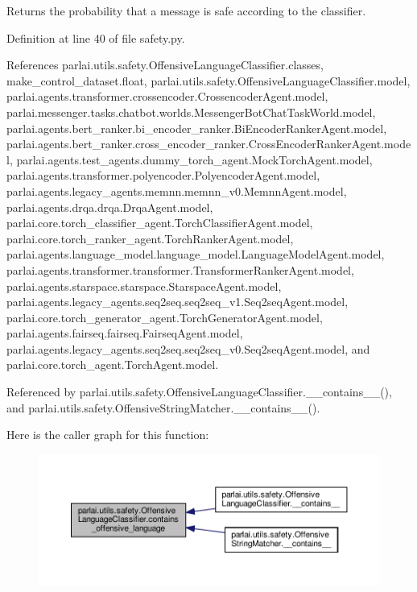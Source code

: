 \begin{DoxyVerb}Returns the probability that a message is safe according to the
classifier.
\end{DoxyVerb}
 

Definition at line 40 of file safety.\+py.



References parlai.\+utils.\+safety.\+Offensive\+Language\+Classifier.\+classes, make\+\_\+control\+\_\+dataset.\+float, parlai.\+utils.\+safety.\+Offensive\+Language\+Classifier.\+model, parlai.\+agents.\+transformer.\+crossencoder.\+Crossencoder\+Agent.\+model, parlai.\+messenger.\+tasks.\+chatbot.\+worlds.\+Messenger\+Bot\+Chat\+Task\+World.\+model, parlai.\+agents.\+bert\+\_\+ranker.\+bi\+\_\+encoder\+\_\+ranker.\+Bi\+Encoder\+Ranker\+Agent.\+model, parlai.\+agents.\+bert\+\_\+ranker.\+cross\+\_\+encoder\+\_\+ranker.\+Cross\+Encoder\+Ranker\+Agent.\+model, parlai.\+agents.\+test\+\_\+agents.\+dummy\+\_\+torch\+\_\+agent.\+Mock\+Torch\+Agent.\+model, parlai.\+agents.\+transformer.\+polyencoder.\+Polyencoder\+Agent.\+model, parlai.\+agents.\+legacy\+\_\+agents.\+memnn.\+memnn\+\_\+v0.\+Memnn\+Agent.\+model, parlai.\+agents.\+drqa.\+drqa.\+Drqa\+Agent.\+model, parlai.\+core.\+torch\+\_\+classifier\+\_\+agent.\+Torch\+Classifier\+Agent.\+model, parlai.\+core.\+torch\+\_\+ranker\+\_\+agent.\+Torch\+Ranker\+Agent.\+model, parlai.\+agents.\+language\+\_\+model.\+language\+\_\+model.\+Language\+Model\+Agent.\+model, parlai.\+agents.\+transformer.\+transformer.\+Transformer\+Ranker\+Agent.\+model, parlai.\+agents.\+starspace.\+starspace.\+Starspace\+Agent.\+model, parlai.\+agents.\+legacy\+\_\+agents.\+seq2seq.\+seq2seq\+\_\+v1.\+Seq2seq\+Agent.\+model, parlai.\+core.\+torch\+\_\+generator\+\_\+agent.\+Torch\+Generator\+Agent.\+model, parlai.\+agents.\+fairseq.\+fairseq.\+Fairseq\+Agent.\+model, parlai.\+agents.\+legacy\+\_\+agents.\+seq2seq.\+seq2seq\+\_\+v0.\+Seq2seq\+Agent.\+model, and parlai.\+core.\+torch\+\_\+agent.\+Torch\+Agent.\+model.



Referenced by parlai.\+utils.\+safety.\+Offensive\+Language\+Classifier.\+\_\+\+\_\+contains\+\_\+\+\_\+(), and parlai.\+utils.\+safety.\+Offensive\+String\+Matcher.\+\_\+\+\_\+contains\+\_\+\+\_\+().

Here is the caller graph for this function\+:
\nopagebreak
\begin{figure}[H]
\begin{center}
\leavevmode
\includegraphics[width=350pt]{classparlai_1_1utils_1_1safety_1_1OffensiveLanguageClassifier_a7f4e833bea93ab9f920f2dd2a4b6e586_icgraph}
\end{center}
\end{figure}


